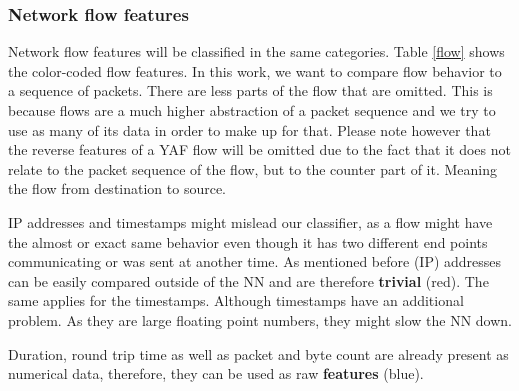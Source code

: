 \documentclass[
	ngerman,
	ruledheaders=section,%
	class=report,%
	thesis={type=bachelor},%
	accentcolor=9c,%
	custommargins=true,%
	marginpar=false,%
	parskip=half-,%
	fontsize=11pt,%
]{tudapub}
\begin{document}
\subsubsection{Network flow features}
\label{sec:flowFeatures}

Network flow features will be classified in the same categories.
Table \ref{flow} shows the color-coded flow features.
In this work, we want to compare flow behavior to a sequence of packets.
There are less parts of the flow that are omitted.
This is because flows are a much higher abstraction of a packet sequence and we try to use as many of its data in order to make up for that.
Please note however that the reverse features of a YAF flow will be omitted due to the fact that it does not relate to the packet sequence of the flow, but to the counter part of it.
Meaning the flow from destination to source.

IP addresses and timestamps might mislead our classifier, as a flow might have the almost or exact same behavior even though it has two different end points communicating or was sent at another time.
As mentioned before (IP) addresses can be easily compared outside of the NN and are therefore \colorbox{trivial}{\textbf{trivial} (red)}.
The same applies for the timestamps.
Although timestamps have an additional problem. As they are large floating point numbers, they might slow the NN down.

Duration, round trip time as well as packet and byte count are already present as numerical data, therefore, they can be used as raw \colorbox{feature}{\textbf{features} (blue)}.

\end{document}
